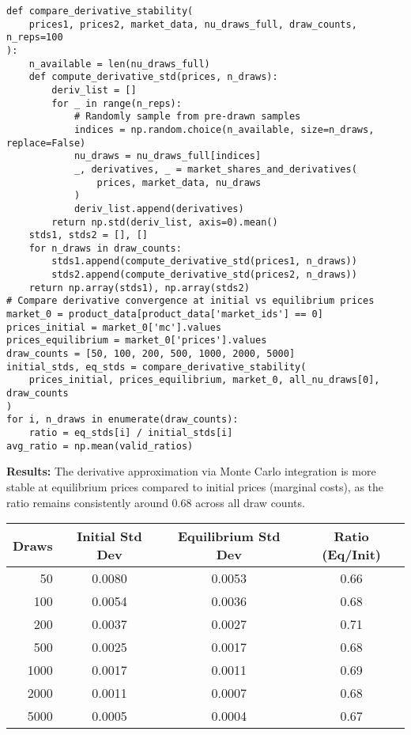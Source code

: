 \documentclass[english,11pt]{article}
\begin{document}
\begin{enumerate}
\begin{enumerate}
\begin{verbatim}
def compare_derivative_stability(
    prices1, prices2, market_data, nu_draws_full, draw_counts, n_reps=100
):
    n_available = len(nu_draws_full)
    def compute_derivative_std(prices, n_draws):
        deriv_list = []
        for _ in range(n_reps):
            # Randomly sample from pre-drawn samples
            indices = np.random.choice(n_available, size=n_draws, replace=False)
            nu_draws = nu_draws_full[indices]
            _, derivatives, _ = market_shares_and_derivatives(
                prices, market_data, nu_draws
            )
            deriv_list.append(derivatives)
        return np.std(deriv_list, axis=0).mean()
    stds1, stds2 = [], []
    for n_draws in draw_counts:
        stds1.append(compute_derivative_std(prices1, n_draws))
        stds2.append(compute_derivative_std(prices2, n_draws))
    return np.array(stds1), np.array(stds2)
# Compare derivative convergence at initial vs equilibrium prices
market_0 = product_data[product_data['market_ids'] == 0]
prices_initial = market_0['mc'].values 
prices_equilibrium = market_0['prices'].values
draw_counts = [50, 100, 200, 500, 1000, 2000, 5000]
initial_stds, eq_stds = compare_derivative_stability(
    prices_initial, prices_equilibrium, market_0, all_nu_draws[0], draw_counts
)
for i, n_draws in enumerate(draw_counts):
    ratio = eq_stds[i] / initial_stds[i] 
avg_ratio = np.mean(valid_ratios)
\end{verbatim}



\textbf{Results:} The derivative approximation via Monte Carlo integration is more stable at equilibrium prices compared to initial prices (marginal costs), as the ratio remains consistently around 0.68 across all draw counts.

\begin{center}
\begin{tabular}{r|c|c|c}
Draws & Initial Std Dev & Equilibrium Std Dev & Ratio (Eq/Init) \\
\hline
50    & 0.0080 & 0.0053 & 0.66 \\
100   & 0.0054 & 0.0036 & 0.68 \\
200   & 0.0037 & 0.0027 & 0.71 \\
500   & 0.0025 & 0.0017 & 0.68 \\
1000  & 0.0017 & 0.0011 & 0.69 \\
2000  & 0.0011 & 0.0007 & 0.68 \\
5000  & 0.0005 & 0.0004 & 0.67 \\
\end{tabular}
\end{center}


\end{enumerate}
\end{enumerate}
\end{document}
